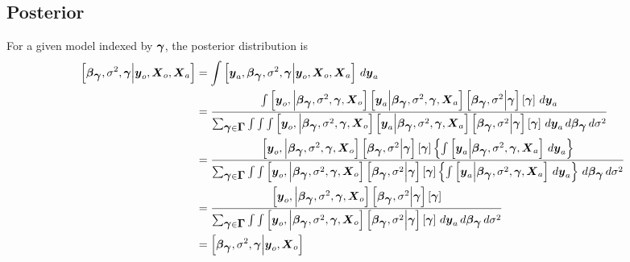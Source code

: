 \documentclass[fleqn]{article}
\def\bm#1{\mbox{\boldmath $#1$}}
\begin{document}
\subsection{Posterior}
%
For a given model indexed by $\bm{\gamma}$, the posterior distribution is
%
\begin{align*}
%
\left[ \bm{\beta}_{\bm{\gamma}}, \sigma^2, \bm{\gamma} \middle| \bm{y}_o, \bm{X}_o, \bm{X}_a \right] & = \int \left[ \bm{y}_a, \bm{\beta}_{\bm{\gamma}}, \sigma^2, \bm{\gamma} \middle| \bm{y}_o, \bm{X}_o, \bm{X}_a \right] \,d \bm{y}_a\\
%
& = \frac{\int \left[ \bm{y}_o, \middle| \bm{\beta}_{\bm{\gamma}}, \sigma^2, \bm{\gamma}, \bm{X}_o \right] \left[ \bm{y}_a \middle| \bm{\beta}_{\bm{\gamma}}, \sigma^2, \bm{\gamma}, \bm{X}_a \right] \left[ \bm{\beta}_{\bm{\gamma}}, \sigma^2 \middle| \bm{\gamma} \right] \left[ \bm{\gamma} \right] \, d \bm{y}_a} {\sum_{\bm{\gamma} \in \bm{\Gamma}} \int \int \int \left[ \bm{y}_o, \middle| \bm{\beta}_{\bm{\gamma}}, \sigma^2, \bm{\gamma}, \bm{X}_o \right] \left[ \bm{y}_a \middle| \bm{\beta}_{\bm{\gamma}}, \sigma^2, \bm{\gamma}, \bm{X}_a \right] \left[ \bm{\beta}_{\bm{\gamma}}, \sigma^2 \middle| \bm{\gamma} \right] \left[ \bm{\gamma} \right] \, d \bm{y}_a \, d \bm{\beta}_{\bm{\gamma}} \, d \sigma^2} \\
%
& = \frac{ \left[ \bm{y}_o, \middle| \bm{\beta}_{\bm{\gamma}}, \sigma^2, \bm{\gamma}, \bm{X}_o \right] \left[ \bm{\beta}_{\bm{\gamma}}, \sigma^2 \middle| \bm{\gamma} \right] \left[ \bm{\gamma} \right] \left\{ \int \left[ \bm{y}_a \middle| \bm{\beta}_{\bm{\gamma}}, \sigma^2, \bm{\gamma}, \bm{X}_a \right] \, d \bm{y}_a \right\} } { \sum_{\bm{\gamma} \in \bm{\Gamma}} \int \int \left[ \bm{y}_o, \middle| \bm{\beta}_{\bm{\gamma}}, \sigma^2, \bm{\gamma}, \bm{X}_o \right] \left[ \bm{\beta}_{\bm{\gamma}}, \sigma^2 \middle| \bm{\gamma} \right] \left[ \bm{\gamma} \right] \left\{ \int  \left[ \bm{y}_a \middle| \bm{\beta}_{\bm{\gamma}}, \sigma^2, \bm{\gamma}, \bm{X}_a \right] \, d \bm{y}_a \right\} \, d \bm{\beta}_{\bm{\gamma}} \, d \sigma^2 
 } \\
%
& = \frac{ \left[ \bm{y}_o, \middle| \bm{\beta}_{\bm{\gamma}}, \sigma^2, \bm{\gamma}, \bm{X}_o \right] \left[ \bm{\beta}_{\bm{\gamma}}, \sigma^2 \middle| \bm{\gamma} \right] \left[ \bm{\gamma} \right] } { \sum_{\bm{\gamma} \in \bm{\Gamma}} \int \int \left[ \bm{y}_o, \middle| \bm{\beta}_{\bm{\gamma}}, \sigma^2, \bm{\gamma}, \bm{X}_o \right] \left[ \bm{\beta}_{\bm{\gamma}}, \sigma^2 \middle| \bm{\gamma} \right] \left[ \bm{\gamma} \right] \, d \bm{y}_a \, d \bm{\beta}_{\bm{\gamma}} \, d \sigma^2 } \\
%
 & = \left[ \bm{\beta}_{\bm{\gamma}}, \sigma^2, \bm{\gamma} \middle| \bm{y}_o, \bm{X}_o \right]
%
\end{align*}
\end{document}
